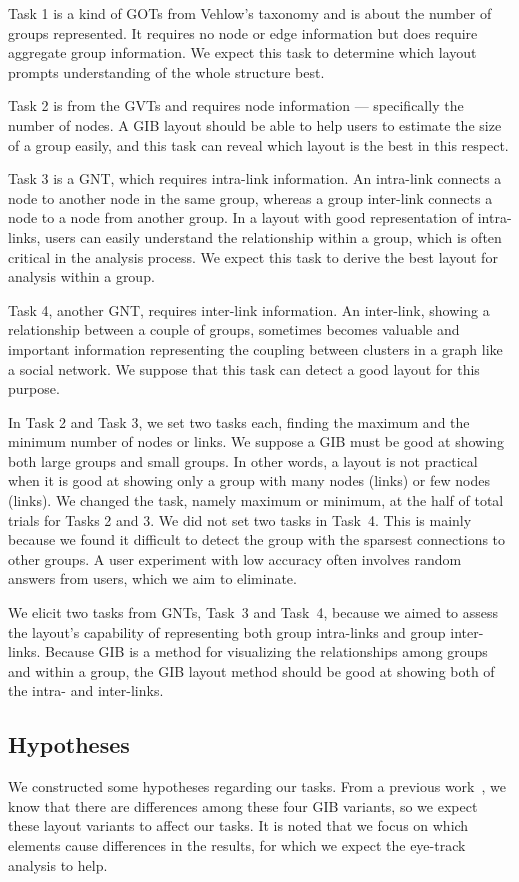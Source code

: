\documentclass[review]{vgtc}                 %
\begin{document}
Task 1 is a kind of GOTs from Vehlow's taxonomy and is about the number of groups represented. It requires no node or edge information but does require aggregate group information. We expect this task to determine which layout prompts understanding of the whole structure best.

Task 2 is from the GVTs and requires node information --- specifically the number of nodes. A GIB layout should be able to help users to estimate the size of a group easily, and this task can reveal which layout is the best in this respect.

Task 3 is a GNT, which requires intra-link information. An intra-link connects a node to another node in the same group, whereas a group inter-link connects a node to a node from another group.
In a layout with good representation of intra-links, users can easily understand the relationship within a group, which is often critical in the analysis process. We expect this task to derive the best layout for analysis within a group.

Task 4, another GNT, requires inter-link information.
An inter-link, showing a relationship between a couple of groups, sometimes becomes valuable and important information representing the coupling between clusters in a graph like a social network. We suppose that this task can detect a good layout for this purpose.

In Task 2 and Task 3, we set two tasks each, finding the maximum and the minimum number of nodes or links.
We suppose a GIB must be good at showing both large groups and small groups. In other words, a layout is not practical when it is good at showing only a group with many nodes (links) or few nodes (links).
We changed the task, namely maximum or minimum, at the half of total trials for Tasks 2 and 3.
We did not set two tasks in Task~4. This is mainly because we found it difficult to detect the group with the sparsest connections to other groups. A user experiment with low accuracy often involves random answers from users, which we aim to eliminate.

We elicit two tasks from GNTs, Task~3 and Task~4, because we aimed to assess the layout's capability of representing both group intra-links and group inter-links.
Because GIB is a method for visualizing the relationships among groups and within a group, the GIB layout method should be good at showing both of the intra- and inter-links.

\subsection{Hypotheses}
We constructed some hypotheses regarding our tasks.
From a previous work~\cite{chaturvedi2014group}, we know that there are differences among these four GIB variants, so we expect these layout variants to affect our tasks. It is noted that we focus on which elements cause differences in the results, for which we expect the eye-track analysis to help.
\end{document}
